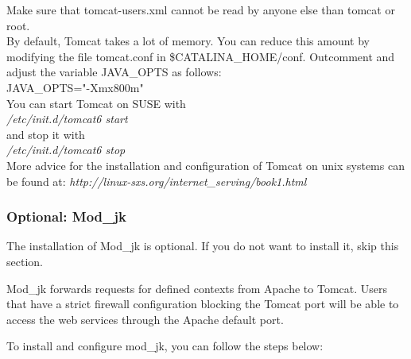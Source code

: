 \documentclass{book}
\begin{document}
Make sure that tomcat-users.xml cannot be read by anyone else than tomcat or root.\\

By default, Tomcat takes a lot of memory. You can reduce this amount by
modifying the file tomcat.conf in \$CATALINA\_HOME/conf.
Outcomment and adjust the variable JAVA\_OPTS as follows:\\
JAVA\_OPTS="-Xmx800m"\\

You can start Tomcat on SUSE with\\
 \textit{/etc/init.d/tomcat6 start}\\
and stop it with\\
 \textit{/etc/init.d/tomcat6 stop}\\

More advice for the installation and configuration of Tomcat on unix systems
can be found at: \textit{http://linux-sxs.org/internet\_serving/book1.html}

\subsubsection{Optional: Mod\_jk}

The installation of Mod\_jk is optional. If you do not want to install it,
skip this section.

Mod\_jk forwards requests for defined contexts from Apache to Tomcat.
Users that have a strict firewall configuration blocking the Tomcat port
will be able to access the web services through the Apache default port.

To install and configure mod\_jk, you can follow the steps below:
\end{document}
